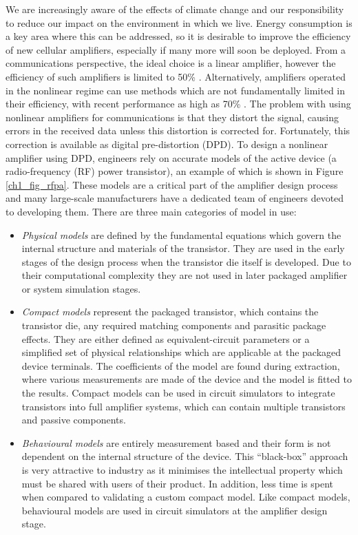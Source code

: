 \documentclass[../thesis/thesis.tex]{subfiles}
\begin{document}
\begin{refsection}
We are increasingly aware of the effects of climate change and our responsibility to reduce our impact on the environment in which we live. Energy consumption is a key area where this can be addressed, so it is desirable to improve the efficiency of new cellular amplifiers, especially if many more will soon be deployed. From a communications perspective, the ideal choice is a linear amplifier, however the efficiency of such amplifiers is limited to 50\% \cite{Cripps_2006}. Alternatively, amplifiers operated in the nonlinear regime can use methods which are not fundamentally limited in their efficiency, with recent performance as high as 70\% \cite{Kosaka_2016,Bhardwaj_2019}. The problem with using nonlinear amplifiers for communications is that they distort the signal, causing errors in the received data unless this distortion is corrected for. Fortunately, this correction is available as digital pre-distortion (DPD). To design a nonlinear amplifier using DPD, engineers rely on accurate models of the active device (a radio-frequency (RF) power transistor), an example of which is shown in Figure \ref{ch1_fig_rfpa}. These models are a critical part of the amplifier design process and many large-scale manufacturers have a dedicated team of engineers devoted to developing them. There are three main categories of model in use:

\begin{itemize}
	\item \emph{Physical models} are defined by the fundamental equations which govern the internal structure and materials of the transistor. They are used in the early stages of the design process when the transistor die itself is developed. Due to their computational complexity they are not used in later packaged amplifier or system simulation stages.
	\item \emph{Compact models} represent the packaged transistor, which contains the transistor die, any required matching components and parasitic package effects. They are either defined as equivalent-circuit parameters or a simplified set of physical relationships which are applicable at the packaged device terminals. The coefficients of the model are found during extraction, where various measurements are made of the device and the model is fitted to the results. Compact models can be used in circuit simulators to integrate transistors into full amplifier systems, which can contain multiple transistors and passive components.
	\item \emph{Behavioural models} are entirely measurement based and their form is not dependent on the internal structure of the device. This ``black-box'' approach is very attractive to industry as it minimises the intellectual property which must be shared with users of their product. In addition, less time is spent when compared to validating a custom compact model. Like compact models, behavioural models are used in circuit simulators at the amplifier design stage.
\end{itemize}


\end{refsection}
\end{document}

